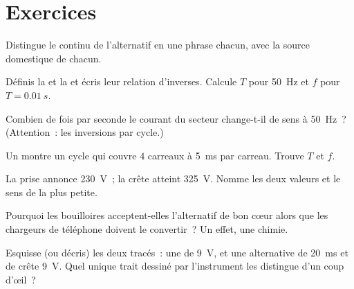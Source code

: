 \section{Exercices}

\begin{exercise}[$\star$]\label{exo:g9:alternating-current:1}
Distingue le continu de l'alternatif en une phrase chacun, avec la
source domestique de chacun.
\end{exercise}

\begin{exercise}[$\star$]\label{exo:g9:alternating-current:2}
Définis la  et la  et écris leur relation
d'inverses. Calcule $T$ pour \qty{50}{Hz} et $f$ pour
$T = \qty{0.01}{s}$.
\end{exercise}

\begin{exercise}[$\star$]\label{exo:g9:alternating-current:3}
Combien de fois par seconde le courant du secteur change-t-il de sens
à \qty{50}{Hz}~? (Attention~: les inversions par cycle.)
\end{exercise}

\begin{exercise}[$\star$]\label{exo:g9:alternating-current:4}
Un  montre un cycle qui couvre $4$ carreaux à
\qty{5}{ms} par carreau. Trouve $T$ et $f$.
\end{exercise}

\begin{exercise}[$\star$]\label{exo:g9:alternating-current:5}
La prise annonce \qty{230}{V}~; la crête atteint \qty{325}{V}. Nomme
les deux valeurs et le sens de la plus petite.
\end{exercise}

\begin{exercise}[$\star$]\label{exo:g9:alternating-current:6}
Pourquoi les bouilloires acceptent-elles l'alternatif de bon cœur
alors que les chargeurs de téléphone doivent le convertir~? Un effet,
une chimie.
\end{exercise}

\begin{exercise}[$\star$]\label{exo:g9:alternating-current:7}
Esquisse (ou décris) les deux tracés~: une  de \qty{9}{V}, et une
 alternative de  \qty{20}{ms} et de crête \qty{9}{V}.
Quel unique trait dessiné par l'instrument les distingue d'un coup
d'œil~?
\end{exercise}


